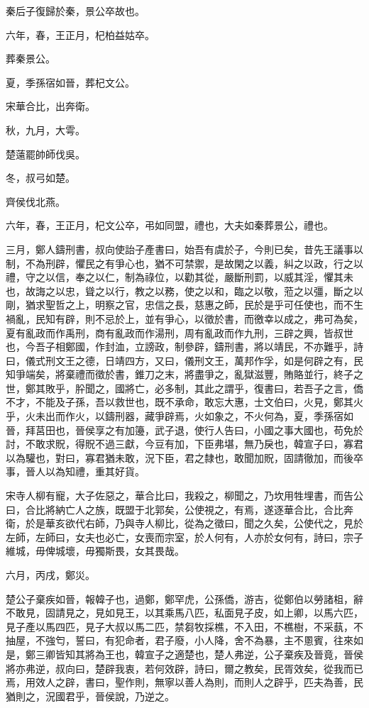\begin{pinyinscope}
秦后子復歸於秦，景公卒故也。

六年，春，王正月，杞柏益姑卒。

葬秦景公。

夏，季孫宿如晉，葬杞文公。

宋華合比，出奔衛。

秋，九月，大雩。

楚薳罷帥師伐吳。

冬，叔弓如楚。

齊侯伐北燕。

六年，春，王正月，杞文公卒，弔如同盟，禮也，大夫如秦葬景公，禮也。

三月，鄭人鑄刑書，叔向使詒子產書曰，始吾有虞於子，今則已矣，昔先王議事以制，不為刑辟，懼民之有爭心也，猶不可禁禦，是故閑之以義，糾之以政，行之以禮，守之以信，奉之以仁，制為祿位，以勸其從，嚴斷刑罰，以威其淫，懼其未也，故誨之以忠，聳之以行，教之以務，使之以和，臨之以敬，蒞之以彊，斷之以剛，猶求聖哲之上，明察之官，忠信之長，慈惠之師，民於是乎可任使也，而不生禍亂，民知有辟，則不忌於上，並有爭心，以徵於書，而徼幸以成之，弗可為矣，夏有亂政而作禹刑，商有亂政而作湯刑，周有亂政而作九刑，三辟之興，皆叔世也，今吾子相鄭國，作封洫，立謗政，制參辟，鑄刑書，將以靖民，不亦難乎，詩曰，儀式刑文王之德，日靖四方，又曰，儀刑文王，萬邦作孚，如是何辟之有，民知爭端矣，將棄禮而徵於書，錐刀之末，將盡爭之，亂獄滋豐，賄賂並行，終子之世，鄭其敗乎，肸聞之，國將亡，必多制，其此之謂乎，復書曰，若吾子之言，僑不才，不能及子孫，吾以救世也，既不承命，敢忘大惠，士文伯曰，火見，鄭其火乎，火未出而作火，以鑄刑器，藏爭辟焉，火如象之，不火何為，夏，季孫宿如晉，拜莒田也，晉侯享之有加籩，武子退，使行人告曰，小國之事大國也，苟免於討，不敢求貺，得貺不過三獻，今豆有加，下臣弗堪，無乃戾也，韓宣子曰，寡君以為驩也，對曰，寡君猶未敢，況下臣，君之隸也，敢聞加貺，固請徹加，而後卒事，晉人以為知禮，重其好貨。

宋寺人柳有寵，大子佐惡之，華合比曰，我殺之，柳聞之，乃坎用牲埋書，而告公曰，合比將納亡人之族，既盟于北郭矣，公使視之，有焉，遂逐華合比，合比奔衛，於是華亥欲代右師，乃與寺人柳比，從為之徵曰，聞之久矣，公使代之，見於左師，左師曰，女夫也必亡，女喪而宗室，於人何有，人亦於女何有，詩曰，宗子維城，毋俾城壞，毋獨斯畏，女其畏哉。

六月，丙戌，鄭災。

楚公子棄疾如晉，報韓子也，過鄭，鄭罕虎，公孫僑，游吉，從鄭伯以勞諸柤，辭不敢見，固請見之，見如見王，以其乘馬八匹，私面見子皮，如上卿，以馬六匹，見子產以馬四匹，見子大叔以馬二匹，禁芻牧採樵，不入田，不樵樹，不采蓺，不抽屋，不強匄，誓曰，有犯命者，君子廢，小人降，舍不為暴，主不慁賓，往來如是，鄭三卿皆知其將為王也，韓宣子之適楚也，楚人弗逆，公子棄疾及晉竟，晉侯將亦弗逆，叔向曰，楚辟我衷，若何效辟，詩曰，爾之教矣，民胥效矣，從我而已焉，用效人之辟，書曰，聖作則，無寧以善人為則，而則人之辟乎，匹夫為善，民猶則之，況國君乎，晉侯說，乃逆之。


\end{pinyinscope}
